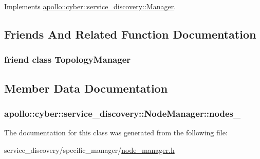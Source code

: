 Implements \hyperlink{classapollo_1_1cyber_1_1service__discovery_1_1Manager_a95a679e0fc7904e6f1a8b2fdd139cc03}{apollo\-::cyber\-::service\-\_\-discovery\-::\-Manager}.



\subsection{Friends And Related Function Documentation}
\hypertarget{classapollo_1_1cyber_1_1service__discovery_1_1NodeManager_ae83aaddaeb682129a07c148e01291cdd}{
\subsubsection[{Topology\-Manager}]{\setlength{\rightskip}{0pt plus 5cm}friend class {\bf Topology\-Manager}\hspace{0.3cm}{\ttfamily [friend]}}}\label{classapollo_1_1cyber_1_1service__discovery_1_1NodeManager_ae83aaddaeb682129a07c148e01291cdd}


\subsection{Member Data Documentation}
\hypertarget{classapollo_1_1cyber_1_1service__discovery_1_1NodeManager_a62b25f2a35068e34963f8faa0faa9509}{
\subsubsection[{nodes\-\_\-}]{ apollo\-::cyber\-::service\-\_\-discovery\-::\-Node\-Manager\-::nodes\-\_\-\hspace{0.3cm}{\ttfamily [private]}}}\label{classapollo_1_1cyber_1_1service__discovery_1_1NodeManager_a62b25f2a35068e34963f8faa0faa9509}


The documentation for this class was generated from the following file\-:\begin{DoxyCompactItemize}
\item 
service\-\_\-discovery/specific\-\_\-manager/\hyperlink{node__manager_8h}{node\-\_\-manager.\-h}\end{DoxyCompactItemize}
